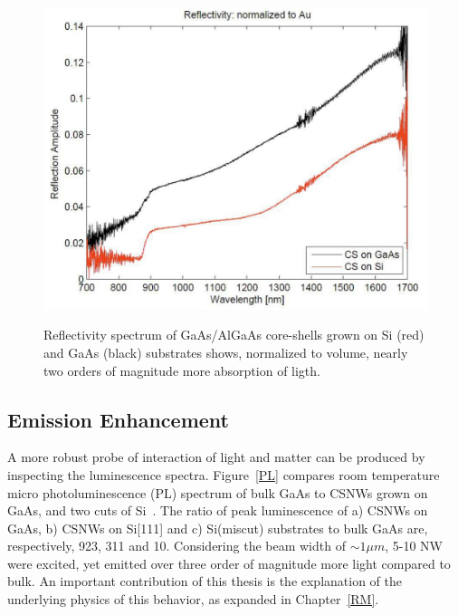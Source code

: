 \begin{figure}
  \caption{Reflectivity spectrum of GaAs/AlGaAs core-shells grown on Si (red) and GaAs (black) substrates shows, normalized to volume, nearly two orders of magnitude more absorption of ligth.}
  \centering
  \includegraphics[width=\textwidth]{pictures/Data/reflectCSNW}
  \label{reflectCSNW}
\end{figure}

\subsection{Emission Enhancement} \label{Dust_data}

A more robust probe of interaction of light and matter can be produced by
inspecting the luminescence spectra. Figure~\ref{PL} compares room temperature
micro photoluminescence (PL) spectrum of bulk GaAs to CSNWs grown on GaAs, and
two cuts of Si~\cite{Currie:2013to}. The ratio of peak luminescence of a)
CSNWs on GaAs, b) CSNWs on Si[111] and c) Si(miscut) substrates to bulk GaAs
are, respectively, 923, 311 and 10. Considering the beam width of
$\sim1{\mu}m$, 5-10 NW were excited, yet emitted over three order of magnitude
more light compared to bulk. An important contribution of this thesis is the
explanation of the underlying physics of this behavior, as expanded in
Chapter~\ref{RM}.

